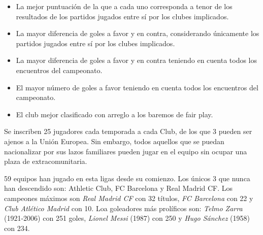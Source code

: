 \begin{itemize}

	\item La mejor puntuación de la que a cada uno corresponda a tenor de los resultados de los partidos jugados entre sí por los clubes implicados.

	\item La mayor diferencia de goles a favor y en contra, considerando únicamente los partidos jugados entre sí por los clubes implicados.

	\item La mayor diferencia de goles a favor y en contra teniendo en cuenta todos los encuentros del campeonato.

	\item El mayor número de goles a favor teniendo en cuenta todos los encuentros del campeonato.

	\item El club mejor clasificado con arreglo a los baremos de fair play.

\end{itemize}

Se inscriben 25 jugadores cada temporada a cada Club, de los que 3 pueden ser ajenos a la Unión Europea. Sin embargo, todos aquellos que se puedan nacionalizar por sus lazos familiares pueden jugar en el equipo sin ocupar una plaza de extracomunitaria.

59 equipos han jugado en esta ligas desde su comienzo. Los únicos 3 que nunca han descendido son: Athletic Club, FC Barcelona y Real Madrid CF. Los campeones máximos son \emph{Real Madrid CF} con 32 títulos, \emph{FC Barcelona} con 22 y \emph{Club Atlético Madrid} con 10. Loa goleadores más prolíficos son: \emph{Telmo Zarra} (1921-2006) con 251 goles, \emph{Lionel Messi} (1987) con 250 y \emph{Hugo Sánchez} (1958) con 234. \cite{primera}


